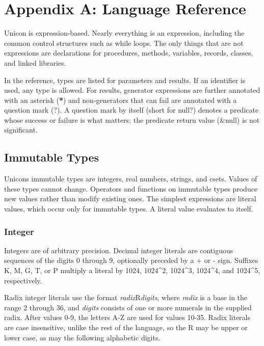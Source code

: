 \clearpage\section{Appendix A: Language Reference}

Unicon is expression-based. Nearly everything is an expression,
including the common control structures such
as while loops. The only things that are not expressions are
declarations for procedures, methods, variables, records, classes, and
linked libraries.

In the reference, types are listed for parameters and results. If an
identifier is used, any type is allowed. For results,
generator expressions are further annotated with an
asterisk (\textsf{\textbf{*}}) and non-generators that can
fail are annotated with a question mark
(\textsf{?}). A question mark by itself (short for \textsf{null?})
denotes a predicate whose success or failure is what matters; the
predicate return value (\textsf{\&null}) is not significant.

\subsection{Immutable Types}

Unicon{\textquotesingle}s immutable types are integers, real numbers,
strings, and csets. Values of these types cannot change. Operators and
functions on immutable types produce new values rather than modify
existing ones. The simplest expressions are literal values, which occur
only for immutable types. A literal value evaluates to itself.

\subsubsection{Integer}

Integers are of arbitrary precision. Decimal integer
literals are contiguous sequences of the digits 0 through 9, optionally
preceded by a + or - sign.  Suffixes K, M, G, T, or P multiply
a literal by 1024, 1024\^{}2, 1024\^{}3, 1024\^{}4, and
1024\^{}5, respectively.

Radix integer literals use the format
\textit{radix}R\textit{digits}, where \textit{radix} is a base in the
range 2 through 36, and \textit{digits} consists of one or more
numerals in the supplied radix. After values 0-9, the letters A-Z are
used for values 10-35. Radix literals are case insensitive, unlike the
rest of the language, so the R may be upper or lower case, as may the
following alphabetic digits.

